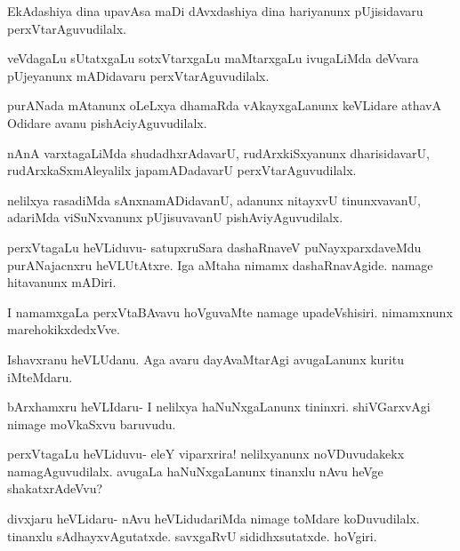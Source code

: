 \documentclass{article}
\begin{document}
\begin{mng}%
EkAdashiya dina upavAsa maDi dAvxdashiya dina hariyanunx pUjisidavaru 
perxVtarAguvudilalx.
\end{mng}

\begin{mng}%
veVdagaLu sUtatxgaLu sotxVtarxgaLu maMtarxgaLu ivugaLiMda deVvara 
pUjeyanunx mADidavaru perxVtarAguvudilalx.
\end{mng}

\begin{mng}%
purANada mAtanunx oLeLxya dhamaRda vAkayxgaLanunx keVLidare athavA 
Odidare avanu pishAciyAguvudilalx.
\end{mng}

\begin{mng}%
nAnA varxtagaLiMda shudadhxrAdavarU, rudArxkiSxyanunx dharisidavarU, 
rudArxkaSxmAleyalilx japamADadavarU perxVtarAguvudilalx.
\end{mng}

\begin{mng}%
nelilxya rasadiMda sAnxnamADidavanU, adanunx nitayxvU tinunxvavanU, 
adariMda viSuNxvanunx pUjisuvavanU pishAviyAguvudilalx.
\end{mng}

\begin{mng}%
perxVtagaLu heVLiduvu- satupxruSara dashaRnaveV puNayxparxdaveMdu 
purANajacnxru heVLUtAtxre. Iga aMtaha nimamx dashaRnavAgide. namage 
hitavanunx mADiri.
\end{mng}

\begin{mng}%
I namamxgaLa perxVtaBAvavu hoVguvaMte namage upadeVshisiri. nimamxnunx 
marehokikxdedxVve.
\end{mng}

\begin{mng}%
Ishavxranu heVLUdanu. Aga avaru dayAvaMtarAgi avugaLanunx kuritu 
iMteMdaru.
\end{mng}

\begin{mng}%
bArxhamxru heVLIdaru- I nelilxya haNuNxgaLanunx tininxri. shiVGarxvAgi 
nimage moVkaSxvu baruvudu.
\end{mng}

\begin{mng}%
perxVtagaLu heVLiduvu- eleY viparxrira! nelilxyanunx noVDuvudakekx 
namagAguvudilalx. avugaLa haNuNxgaLanunx tinanxlu nAvu heVge 
shakatxrAdeVvu?
\end{mng}

\begin{mng}%
divxjaru heVLidaru- nAvu heVLidudariMda nimage toMdare koDuvudilalx. 
tinanxlu sAdhayxvAgutatxde. savxgaRvU sididhxsutatxde. hoVgiri.
\end{mng}
\end{document}
